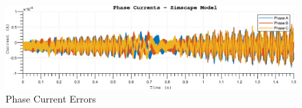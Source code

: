 \begin{figure}[htb]
\begingroup
\tikzset{}
 \centerline{\includegraphics[width=1\columnwidth]{.//Figure/EPS/err_speedramp_currents.eps}}
 \endgroup
 \caption{Phase Current Errors}
 \label{fig:err_speedramp_current}
\end{figure}